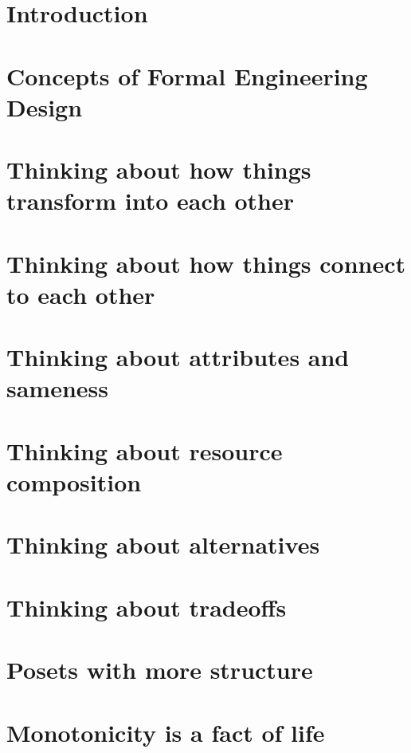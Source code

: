 \documentclass[paper=6in:9in,pagesize=pdftex,
 headinclude=off,footinclude=on,11pt,twoside]{scrbook}
\begin{document}
\clearpage

\tableofcontents
\chapter{Introduction}

\clearpage
\chapter{Concepts of  Formal Engineering Design}

\clearpage
\chapter{Thinking about how things transform into each other}

\clearpage
\chapter{Thinking about how things connect to each other}

\chapter{Thinking about attributes and sameness}

\clearpage
\chapter{Thinking about resource composition}

\clearpage
\chapter{Thinking about alternatives}

\clearpage
\chapter{Thinking about tradeoffs}

\clearpage
\chapter{Posets with more structure}

\clearpage
\chapter{Monotonicity is a fact of life}

\clearpage
\end{document}
